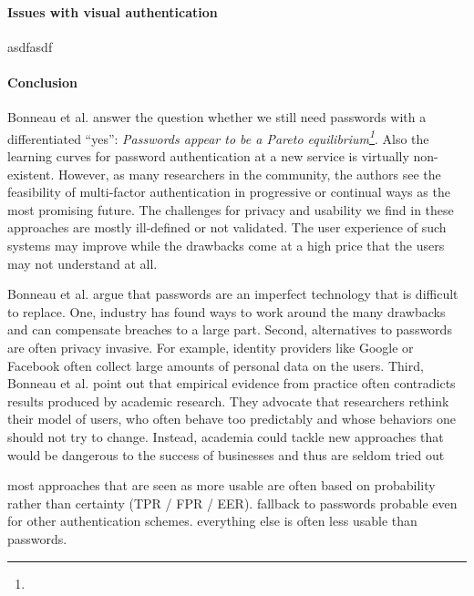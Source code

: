 
\paragraph{Issues with visual authentication}
asdfasdf

\paragraph{Conclusion}
Bonneau et al. answer the question whether we still need passwords with a differentiated ``yes'': \textit{Passwords appear to be a Pareto equilibrium\footnote{}}. Also the learning curves for password authentication at a new service is virtually non-existent. However, as many researchers in the community, the authors see the feasibility of multi-factor authentication in progressive or continual ways as the most promising future. The challenges for privacy and usability we find in these approaches are mostly ill-defined or not validated. The user experience of such systems may improve while the drawbacks come at a high price that the users may not understand at all. 

Bonneau et al. argue \cite{Bonneau2015ImperfectAuthentication} that passwords are an imperfect technology that is difficult to replace. One, industry has found ways to work around the many drawbacks and can compensate breaches to a large part. Second, alternatives to passwords are often privacy invasive. For example, identity providers like Google or Facebook often collect large amounts of personal data on the users. Third, Bonneau et al. point out that empirical evidence from practice often contradicts results produced by academic research. They advocate that researchers rethink their model of users, who often behave too predictably and whose behaviors one should not try to change. Instead, academia could tackle new approaches that would be dangerous to the success of businesses and thus are seldom tried out

most approaches that are seen as more usable are often based on probability rather than certainty (TPR / FPR / EER). fallback to passwords probable even for other authentication schemes. everything else is often less usable than passwords. 

